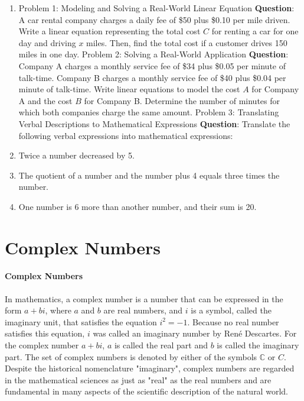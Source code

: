 \begin{enumerate}
    \item Problem 1: Modeling and Solving a Real-World Linear Equation \textbf{Question}: A car rental company charges a daily fee of \$50 plus \$0.10 per mile driven. Write a linear equation representing the total cost $C$ for renting a car for one day and driving $x$ miles. Then, find the total cost if a customer drives 150 miles in one day. Problem 2: Solving a Real-World Application \textbf{Question}: Company A charges a monthly service fee of \$34 plus \$0.05 per minute of talk-time. Company B charges a monthly service fee of \$40 plus \$0.04 per minute of talk-time. Write linear equations to model the cost $A$ for Company A and the cost $B$ for Company B. Determine the number of minutes for which both companies charge the same amount. Problem 3: Translating Verbal Descriptions to Mathematical Expressions \textbf{Question}: Translate the following verbal expressions into mathematical expressions:
    \item Twice a number decreased by 5.
    \item The quotient of a number and the number plus 4 equals three times the number.
    \item One number is 6 more than another number, and their sum is 20.
\end{enumerate}

\section{Complex Numbers}
\label{sec:complex-numbers}

\paragraph{Complex Numbers}

In mathematics, a complex number is a number that can be expressed in the form $a + bi$, where $a$ and $b$ are real numbers, and $i$ is a symbol, called the imaginary unit, that satisfies the equation $i^2 = -1$. Because no real number satisfies this equation, $i$ was called an imaginary number by René Descartes. For the complex number $a + bi$, $a$ is called the real part and $b$ is called the imaginary part. The set of complex numbers is denoted by either of the symbols $\mathbb{C}$ or $C$. Despite the historical nomenclature "imaginary", complex numbers are regarded in the mathematical sciences as just as "real" as the real numbers and are fundamental in many aspects of the scientific description of the natural world.


